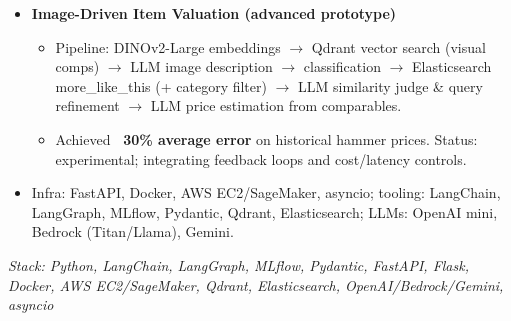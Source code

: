\documentclass[10pt,a4paper]{altacv}
\begin{document}
\begin{itemize}
\begin{itemize}
  \end{itemize}
  \item \textbf{Image-Driven Item Valuation (advanced prototype)}
  \begin{itemize}
    \item Pipeline: DINOv2-Large embeddings $\rightarrow$ Qdrant vector search (visual comps) $\rightarrow$ LLM image description $\rightarrow$ classification $\rightarrow$ Elasticsearch more\_like\_this (+ category filter) $\rightarrow$ LLM similarity judge \& query refinement $\rightarrow$ LLM price estimation from comparables.
    \item Achieved \textbf{~30\% average error} on historical hammer prices. Status: experimental; integrating feedback loops and cost/latency controls.
  \end{itemize}
  \item Infra: FastAPI, Docker, AWS EC2/SageMaker, asyncio; tooling: LangChain, LangGraph, MLflow, Pydantic, Qdrant, Elasticsearch; LLMs: OpenAI mini, Bedrock (Titan/Llama), Gemini.
\end{itemize}
\textit{Stack: Python, LangChain, LangGraph, MLflow, Pydantic, FastAPI, Flask, Docker, AWS EC2/SageMaker, Qdrant, Elasticsearch, OpenAI/Bedrock/Gemini, asyncio}

\divider
\end{document}
